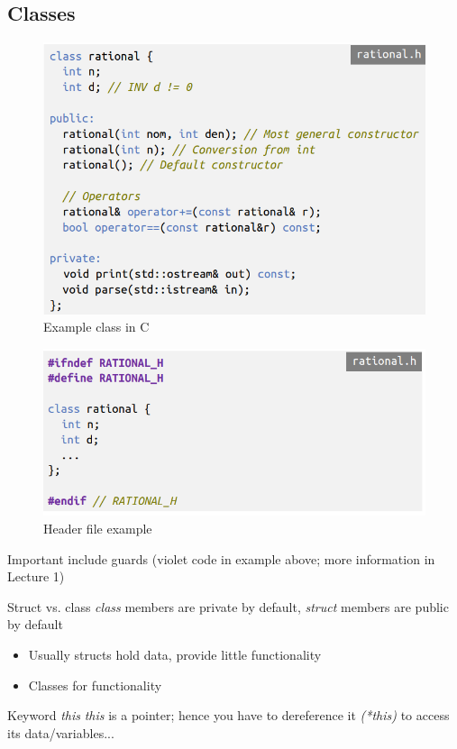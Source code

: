 \documentclass[a4paper,10pt]{article}
\begin{document}
\subsection{Classes}
\begin{figure}[h]
    \centering
    \includegraphics[width=0.7\linewidth]{e8.png}
    \caption{Example class in C}
    \label{fig:enter-label}
\end{figure}
\begin{figure}
    \centering
    \includegraphics[width=0.75\linewidth]{e9.png}
    \caption{Header file example}
    \label{fig:enter-label}
\end{figure}
\begin{tipbox}
    {Important}
    include guards (violet code in example above; more information in Lecture 1)
\end{tipbox}
\begin{tbox}
    {Struct vs. class}
    \textit{class} members are private by default, \textit{struct} members are public by default
\end{tbox}
\begin{itemize}
    \item Usually structs hold data, provide little functionality
    \item Classes for functionality
\end{itemize}
\begin{tbox}
    {Keyword \textit{this}}
    \textit{this} is a pointer; hence you have to dereference it \textit{(*this)} to access its data/variables...
\end{tbox}
\end{document}
